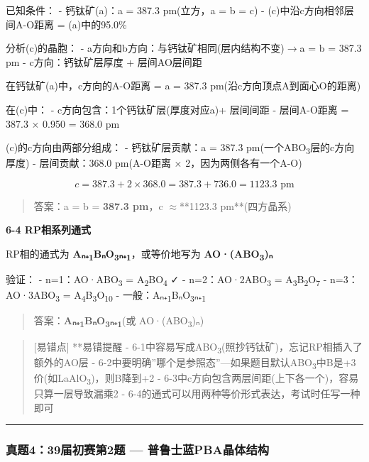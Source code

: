 \documentclass[a4paper,11pt]{ctexart}
\newcommand{\箭}{\ensuremath{\rightarrow}}
\newcommand{\左箭}{\ensuremath{\leftarrow}}
\newcommand{\上箭}{\ensuremath{\uparrow}}
\newcommand{\下箭}{\ensuremath{\downarrow}}
\newcommand{\衡}{\ensuremath{\rightleftharpoons}}
\newcommand{\双箭}{\ensuremath{\leftrightarrow}}
\newcommand{\约等于}{\ensuremath{\approx}}
\newcommand{\小于等于}{\ensuremath{\leq}}
\newcommand{\大于等于}{\ensuremath{\geq}}
\newcommand{\不等于}{\ensuremath{\neq}}
\newcommand{\西格马}{\ensuremath{\sigma}}
\newcommand{\派}{\ensuremath{\pi}}
\begin{document}
已知条件：
- 钙钛矿(a)：a = 387.3 pm(立方，a = b = c)
- (c)中沿c方向相邻层间A-O距离 = (a)中的95.0\%

分析(c)的晶胞：
- a方向和b方向：与钙钛矿相同(层内结构不变)\箭 a = b = 387.3 pm
- c方向：钙钛矿层厚度 + 层间AO层间距

在钙钛矿(a)中，c方向的A-O距离 = a = 387.3 pm(沿c方向顶点A到面心O的距离)

在(c)中：
- c方向包含：1个钙钛矿层(厚度对应a)+ 层间间距
- 层间A-O距离 = 387.3 × 0.950 = 368.0 pm

(c)的c方向由两部分组成：
- 钙钛矿层贡献：a = 387.3 pm(一个ABO\textsubscript{3}层的c方向厚度)
- 层间贡献：368.0 pm(A-O距离 × 2，因为两侧各有一个A-O)

\[c = 387.3 + 2 \times 368.0 = 387.3 + 736.0 = 1123.3 \text{ pm}\]

\begin{quote}
答案：a = b = \textbf{387.3 pm}，c \约等于 **1123.3 pm**(四方晶系)
\end{quote}

\textbf{6-4 RP相系列通式}

RP相的通式为 \textbf{Aₙ₊\textsubscript{1}BₙO\textsubscript{3}ₙ₊\textsubscript{1}}，或等价地写为 \textbf{AO·(ABO\textsubscript{3})ₙ}

验证：
- n=1：AO·ABO\textsubscript{3} = A\textsubscript{2}BO\textsubscript{4} ✓
- n=2：AO·2ABO\textsubscript{3} = A\textsubscript{3}B\textsubscript{2}O\textsubscript{7}
- n=3：AO·3ABO\textsubscript{3} = A\textsubscript{4}B\textsubscript{3}O\textsubscript{10}
- 一般：Aₙ₊\textsubscript{1}BₙO\textsubscript{3}ₙ₊\textsubscript{1}

\begin{quote}
答案：\textbf{Aₙ₊\textsubscript{1}BₙO\textsubscript{3}ₙ₊\textsubscript{1}}(或 AO·(ABO\textsubscript{3})ₙ)
\end{quote}

\begin{quote}
{[}易错点{]} **易错提醒
- 6-1中容易写成ABO\textsubscript{3}(照抄钙钛矿)，忘记RP相插入了额外的AO层
- 6-2中要明确''哪个是参照态''---如果题目默认ABO\textsubscript{3}中B是+3价(如LaAlO\textsubscript{3})，则B降到+2
- 6-3中c方向包含两层间距(上下各一个)，容易只算一层导致漏乘2
- 6-4的通式可以用两种等价形式表达，考试时任写一种即可
\end{quote}

\begin{center}\rule{0.5\linewidth}{0.5pt}\end{center}

\subsubsection{真题4：39届初赛第2题 --- 普鲁士蓝PBA晶体结构}\label{ux771fux9898439ux5c4aux521dux8d5bux7b2c2ux9898-ux666eux9c81ux58ebux84ddpbaux6676ux4f53ux7ed3ux6784}
\end{document}
